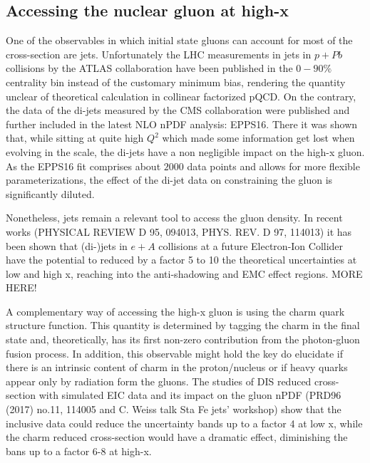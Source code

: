 

\subsection{Accessing the nuclear gluon at high-x}

One of the observables in which initial state gluons can account for most of the cross-section are jets. Unfortunately the LHC measurements in jets in $p+Pb$ collisions by the ATLAS collaboration have been published in the $0-90\%$ centrality bin instead of the customary minimum bias, rendering the quantity unclear of theoretical calculation in collinear factorized pQCD. On the contrary, the data of the di-jets measured by the CMS collaboration were published and further included in the latest NLO nPDF analysis: EPPS16. There it was shown that, while sitting at quite high $Q^{2}$ which made some information get lost when evolving in the scale, the di-jets have a non negligible impact on the high-x gluon. As the EPPS16 fit comprises about $2000$ data points and allows for more flexible parameterizations, the effect of the di-jet data on constraining the gluon is significantly diluted. 

Nonetheless, jets remain a relevant tool to access the gluon density. In recent works (PHYSICAL REVIEW D 95, 094013, PHYS. REV. D 97, 114013) it has been shown that (di-)jets in $e+A$ collisions at a future Electron-Ion Collider have the potential to reduced by a factor 5 to 10 the theoretical uncertainties at low and high x, reaching into the anti-shadowing and EMC effect regions. MORE HERE!

A complementary way of accessing the high-x gluon is using the charm quark structure function. This quantity is determined by tagging the charm in the final state and, theoretically, has its first non-zero contribution from the photon-gluon fusion process. In addition, this observable might hold the key do elucidate if there is an intrinsic content of charm in the proton/nucleus or if heavy quarks appear only by radiation form the gluons. The studies of DIS reduced cross-section with simulated EIC data and its impact on the gluon nPDF (PRD96 (2017) no.11, 114005 and C. Weiss talk Sta Fe jets' workshop) show that the inclusive data could reduce the uncertainty bands up to a factor 4 at low x, while the charm reduced cross-section would have a dramatic effect, diminishing the bans up to a factor 6-8 at high-x.   





%




